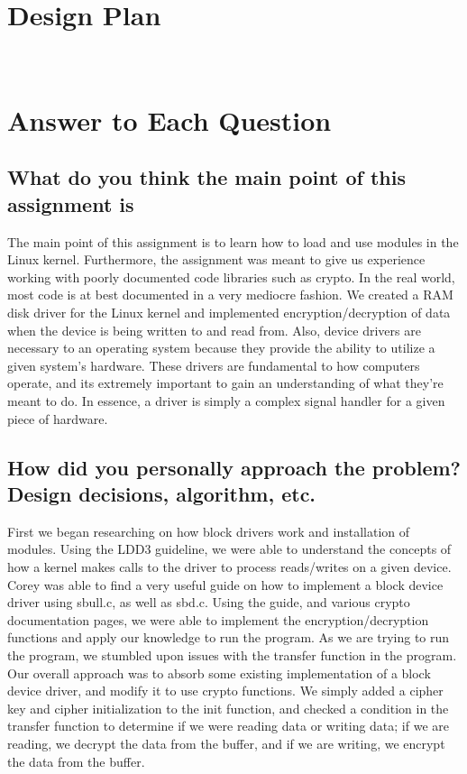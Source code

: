 \documentclass[onecolumn, draftclsnofoot,10pt, compsoc]{IEEEtran}
\begin{document}
\section{Design Plan}
\noindent
\\

\section{Answer to Each Question }
\subsection{What do you think the main point of this assignment is}
\noindent The main point of this assignment is to learn how to load and use modules in the Linux kernel. Furthermore, the assignment was meant to give us experience working with poorly documented code libraries such as crypto. In the real world, most code is at best documented in a very mediocre fashion. We created a RAM disk driver for the Linux kernel and implemented encryption/decryption of data when the device is being written to and read from. Also, device drivers are necessary to an operating system because they provide the ability to utilize a given system's hardware. These drivers are fundamental to how computers operate, and its extremely important to gain an understanding of what they're meant to do. In essence, a driver is simply a complex signal handler for a given piece of hardware.
\\

\subsection{How did you personally approach the problem? Design decisions, algorithm, etc.}
\noindent First we began researching on how block drivers work and installation of modules. Using the LDD3 guideline, we were able to understand the concepts of how a kernel makes calls to the driver to process reads/writes on a given device. Corey was able to find a very useful guide on how to implement a block device driver using sbull.c, as well as sbd.c. Using the guide, and various crypto documentation pages, we were able to implement the encryption/decryption functions and apply our knowledge to run the program. As we are trying to run the program, we stumbled upon issues with the transfer function in the program. Our overall approach was to absorb some existing implementation of a block device driver, and modify it to use crypto functions. We simply added a cipher key and cipher initialization to the init function, and checked a condition in the transfer function to determine if we were reading data or writing data; if we are reading, we decrypt the data from the buffer, and if we are writing, we encrypt the data from the buffer.
\\
\end{document}
